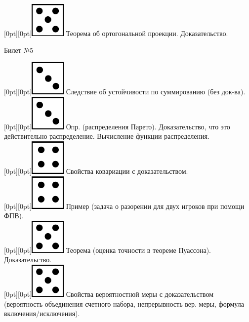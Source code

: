 \documentclass[10pt]{article}
\begin{document}
\raisebox{-1pt}[0pt][0pt]{\includegraphics[width=0.02\linewidth]{5.png}} Теорема об ортогональной проекции. Доказательство. \\

\begin{center} {\Large Билет №5} \end{center} 

\raisebox{-1pt}[0pt][0pt]{\includegraphics[width=0.02\linewidth]{3.png}} Следствие об устойчивости по суммированию (без док-ва). \\

\raisebox{-1pt}[0pt][0pt]{\includegraphics[width=0.02\linewidth]{3.png}} Опр. (распределения Парето). Доказательство, что это действительно распределение. Вычисление функции распределения. \\

\raisebox{-1pt}[0pt][0pt]{\includegraphics[width=0.02\linewidth]{4.png}} Свойства ковариации с доказательством. \\

\raisebox{-1pt}[0pt][0pt]{\includegraphics[width=0.02\linewidth]{4.png}} Пример (задача о разорении для двух игроков при помощи ФПВ). \\ 

\raisebox{-1pt}[0pt][0pt]{\includegraphics[width=0.02\linewidth]{5.png}} Теорема (оценка точности в теореме Пуассона). Доказательство. \\

\raisebox{-1pt}[0pt][0pt]{\includegraphics[width=0.02\linewidth]{5.png}} Свойства  вероятностной меры с доказательством (вероятность объединения счетного набора, непрерывность вер. меры, формула включения/исключения). \\
\end{document}
